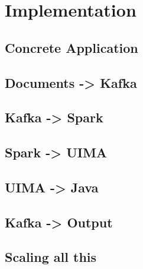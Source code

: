 \chapter{Implementation}

\section{Concrete Application}

\section{Documents -> Kafka}

\section{Kafka -> Spark}

\section{Spark -> UIMA}

\section{UIMA -> Java}

\section{Kafka -> Output}

\section{Scaling all this}
